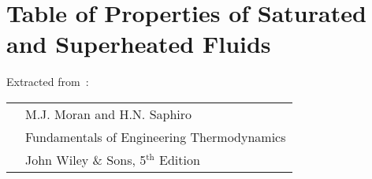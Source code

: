 
\chapter{Table of Properties of Saturated and Superheated Fluids}\label{Appendix:Saturated_SH_Tables}

Extracted from~\cite{Moran_Book}:\\
  \begin{tabular}{c l}
     \hspace{1cm} & M.J. Moran and H.N. Saphiro \\
                  & Fundamentals of Engineering Thermodynamics \\
                  & John Wiley $\&$ Sons, 5$^{\text{th}}$ Edition  \\
  \end{tabular}

  
